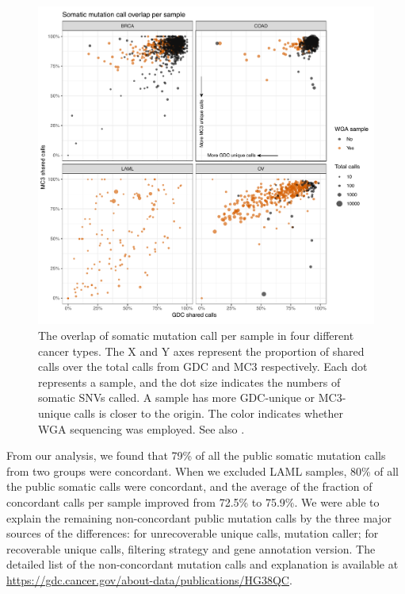 \begin{figure}[tb]
    \centering
    \includegraphics[width=0.9\linewidth]{figures/chap02_mutation_pipeline_qc/GDC_MC3_overlap_per_sample.pdf}
    \caption[Overlapping somatic mutation calls between GDC and MC3 per sample.]{The overlap of somatic mutation call per sample in four different cancer types. The X and Y axes represent the proportion of shared calls over the total calls from GDC and MC3 respectively. Each dot represents a sample, and the dot size indicates the numbers of somatic SNVs called. A sample has more GDC-unique or MC3-unique calls is closer to the origin. The color indicates whether WGA sequencing was employed. See also .}
    \label{fig:mut-call-qc-overlap}
\end{figure}

From our analysis, we found that 79\% of all the public somatic mutation calls from two groups were concordant. When we excluded LAML samples, 80\% of all the public somatic calls were concordant, and the average of the fraction of concordant calls per sample improved from 72.5\% to 75.9\%. We were able to explain the remaining non-concordant public mutation calls by the three major sources of the differences: for unrecoverable unique calls, mutation caller; for recoverable unique calls, filtering strategy and gene annotation version. The detailed list of the non-concordant mutation calls and explanation is available at \url{https://gdc.cancer.gov/about-data/publications/HG38QC}.


